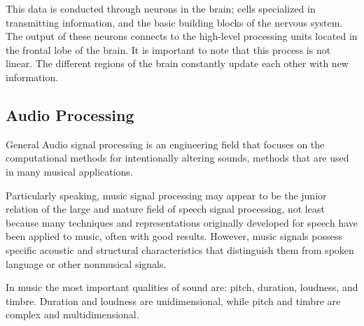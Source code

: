 This data is conducted through neurons in the brain; cells specialized in transmitting information, and the basic building blocks of the nervous system.
The output of these neurons connects to the high-level processing units located in the frontal lobe of the brain. It is important to note that this process
is not linear. The different regions of the brain constantly update each other with new information. 

\subsection{Audio Processing}

General Audio signal processing is an engineering field that focuses on the computational methods for intentionally altering sounds, methods that
are used in many musical applications.

\par Particularly speaking, music signal processing may appear to be the junior relation of the large and mature field of speech signal processing,
not least because many techniques and representations originally developed for speech have been applied to music, often with good results. However,
music signals possess specific acoustic and structural characteristics that distinguish them from spoken language or other nonmusical signals. \cite{muller2011}

In music the most important qualities of sound are: pitch, duration, loudness, and timbre. Duration and loudness are unidimensional, while pitch and timbre are complex and multidimensional. \cite{dooling2014}


